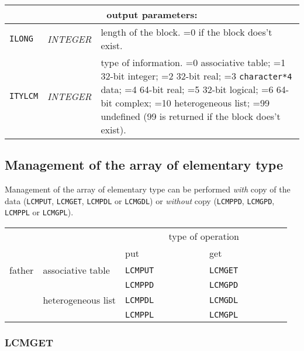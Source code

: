 \vskip 0.8cm

\noindent
\begin{tabular}{|p{1.5cm}|p{3cm}|p{10cm}|}
\hline
\multicolumn{3}{|c|}{\bf output parameters:} \\
\hline
{\tt ILONG} & {\it INTEGER} & length of the block. =0 if the block does't exist. \\
\hline
{\tt ITYLCM} & {\it INTEGER} & type of information. =0 associative table; =1 32-bit integer; 
                                    =2 32-bit real; =3 {\tt character*4} data; 
				    =4 64-bit real; =5 32-bit logical; =6 64-bit complex; =10 heterogeneous list; 
				    =99 undefined (99 is returned if the block does't exist). \\
\hline
\end{tabular}

\subsection{Management of the array of elementary type}

Management of the array of elementary type can be performed {\sl with} copy of the data ({\tt LCMPUT}, {\tt LCMGET}, {\tt LCMPDL} or
{\tt LCMGDL}) or {\sl without} copy ({\tt LCMPPD}, {\tt LCMGPD}, {\tt LCMPPL} or {\tt LCMGPL}).

\vskip 0.4cm

\begin{center}
\begin{tabular}{|c|l|l|l|}
\cline{3-4}
\multicolumn{2}{c|}{} & \multicolumn{2}{c|}{type of operation} \\
\cline{3-4}
\multicolumn{2}{c|}{} & put~~~~~~~~~~~~~ & get~~~~~~~~~~~~~ \\
\hline
father & associative table & {\tt LCMPUT} & {\tt LCMGET} \\
       &                   & {\tt LCMPPD} & {\tt LCMGPD} \\
\cline{2-4}
       & heterogeneous list & {\tt LCMPDL} & {\tt LCMGDL} \\
       &                   & {\tt LCMPPL} & {\tt LCMGPL} \\
\hline
\end{tabular}
\end{center}

\subsubsection{LCMGET}

